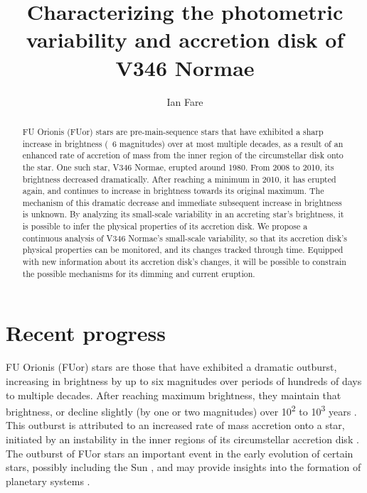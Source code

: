 \documentclass[iop,apj,tighten]{emulateapj}
\begin{document}
\newpage

\title{Characterizing the photometric variability and accretion disk of V346 Normae}
\author{Ian Fare}

\begin{abstract}
FU Orionis (FUor) stars are pre-main-sequence stars that have exhibited a sharp increase in brightness (~6 magnitudes) over at most multiple decades, as a result of an enhanced rate of accretion of mass from the inner region of the circumstellar disk onto the star. One such star, V346 Normae, erupted around 1980. From 2008 to 2010, its brightness decreased dramatically. After reaching a minimum in 2010, it has erupted again, and continues to increase in brightness towards its original maximum. The mechanism of this dramatic decrease and immediate subsequent increase in brightness is unknown. By analyzing its small-scale variability in an accreting star's brightness, it is possible to infer the physical properties of its accretion disk. We propose a continuous analysis of V346 Normae's small-scale variability, so that its accretion disk's physical properties can be monitored, and its changes tracked through time. Equipped with new information about its accretion disk's changes, it will be possible to constrain the possible mechanisms for its dimming and current eruption.
\end{abstract}

\maketitle
\thispagestyle{fancy}

\section{Recent progress}
\label{recent_progress}
FU Orionis (FUor) stars are those that have exhibited a dramatic outburst, increasing in brightness by up to six magnitudes over periods of hundreds of days to multiple decades. After reaching maximum brightness, they maintain that brightness, or decline slightly (by one or two magnitudes) over 10\textsuperscript{2} to 10\textsuperscript{3} years \citep{hartmann_fu_1996}. This outburst is attributed to an increased rate of mass accretion onto a star, initiated by an instability in the inner regions of its circumstellar accretion disk \citep{turner_models_1997}. The outburst of FUor stars an important event in the early evolution of certain stars, possibly including the Sun \citep{herbig_eruptive_1977}, and may provide insights into the formation of planetary systems \citep{turner_models_1997}.
\end{document}
